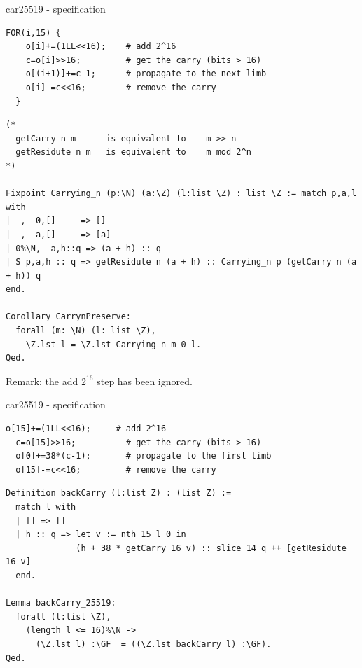 \documentclass[8pt]{beamer}
\begin{document}
\begin{frame}[fragile]{car25519 - specification}
  \begin{center}

\begin{lstlisting}[language=cnacl, caption=car25519 | propagation, label=cod:languageC151]
  FOR(i,15) {
    o[i]+=(1LL<<16);    # add 2^16
    c=o[i]>>16;         # get the carry (bits > 16)
    o[(i+1)]+=c-1;      # propagate to the next limb
    o[i]-=c<<16;        # remove the carry
  }
\end{lstlisting}

\begin{lstlisting}[language=CoqD, caption=car25519 | Proofs of correctness, label=cod:languageC152]
(*
  getCarry n m      is equivalent to    m >> n
  getResidute n m   is equivalent to    m mod 2^n
*)

Fixpoint Carrying_n (p:\N) (a:\Z) (l:list \Z) : list \Z := match p,a,l with
| _,  0,[]     => []
| _,  a,[]     => [a]
| 0%\N,  a,h::q => (a + h) :: q
| S p,a,h :: q => getResidute n (a + h) :: Carrying_n p (getCarry n (a + h)) q
end.

Corollary CarrynPreserve:
  forall (m: \N) (l: list \Z),
    \Z.lst l = \Z.lst Carrying_n m 0 l.
Qed.
\end{lstlisting}

Remark: the add $2^{16}$ step has been ignored.
  \end{center}
\end{frame}


%
%

\begin{frame}[fragile]{car25519 - specification}
  \begin{center}

\begin{lstlisting}[language=cnacl, caption=car25519 | back, label=cod:languageC161]
  o[15]+=(1LL<<16);     # add 2^16
  c=o[15]>>16;          # get the carry (bits > 16)
  o[0]+=38*(c-1);       # propagate to the first limb
  o[15]-=c<<16;         # remove the carry
\end{lstlisting}

\begin{lstlisting}[language=CoqD, caption=car25519 | Proofs of correctness, label=cod:languageC162]
Definition backCarry (l:list Z) : (list Z) :=
  match l with
  | [] => []
  | h :: q => let v := nth 15 l 0 in
              (h + 38 * getCarry 16 v) :: slice 14 q ++ [getResidute 16 v]
  end.

Lemma backCarry_25519:
  forall (l:list \Z),
    (length l <= 16)%\N ->
      (\Z.lst l) :\GF  = ((\Z.lst backCarry l) :\GF).
Qed.
\end{lstlisting}

  \end{center}
\end{frame}
\end{document}
